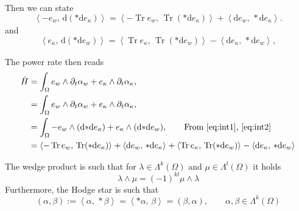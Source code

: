 \documentclass{article}
\DeclareMathOperator{\Tr}{Tr}
\newcommand{\inner}[3][]{\ensuremath{\left\langle #2, \, #3 \right\rangle_{#1}}}
\begin{document}
Then we can state
\begin{equation}\label{eq:int1}
\inner{-e_w}{\mathrm{d}({*}\mathrm{d} e_\kappa)} = \inner{-\Tr e_w}{\Tr({*}\mathrm{d} e_\kappa)} + \inner{\mathrm{d} e_w}{{*}\mathrm{d} e_\kappa}.
\end{equation}
and
\begin{equation}\label{eq:int2}
	\inner{e_\kappa}{\mathrm{d}({*}\mathrm{d} e_w)} = \inner{\Tr e_\kappa}{\Tr ({*}\mathrm{d} e_w)} - \inner{\mathrm{d} e_\kappa}{{*}\mathrm{d} e_w},
\end{equation}

The power rate then reads 
\begin{equation}
\begin{aligned}
\dot{H} &= \int_{\Omega} e_w \wedge \partial_t \alpha_w   + e_\kappa \wedge \partial_t \alpha_\kappa, \\
&= \int_{\Omega} e_w \wedge \partial_t \alpha_w   + e_\kappa \wedge \partial_t \alpha_\kappa, \\
&=\int_{\Omega} -e_w \wedge (\mathrm{d}{*}\mathrm{d} e_\kappa)   + e_\kappa \wedge (\mathrm{d}{*}\mathrm{d} e_w), \qquad \text{From \eqref{eq:int1}, \eqref{eq:int2}}\\
&=\inner{-\Tr e_w}{\Tr({*}\mathrm{d} e_\kappa)} + \inner{\mathrm{d} e_w}{{*}\mathrm{d} e_\kappa} + \inner{\Tr e_\kappa}{\Tr ({*}\mathrm{d} e_w)} - \inner{\mathrm{d} e_\kappa}{{*}\mathrm{d} e_w}
\end{aligned}
\end{equation}

The wedge product is such that for $\lambda \in \Lambda^k(\Omega)$ and $\mu \in \Lambda^l(\Omega)$ it holds
\begin{equation}
\lambda \wedge \mu = (-1)^{kl} \mu \wedge \lambda
\end{equation}
Furthermore, the Hodge star is such that 
\begin{equation}
(\alpha, \beta) := \inner{\alpha}{*\beta} =  \inner{*\alpha}{\beta} = (\beta, \alpha), \qquad \alpha, \beta \in \Lambda^k(\Omega)
\end{equation}
\end{document}
